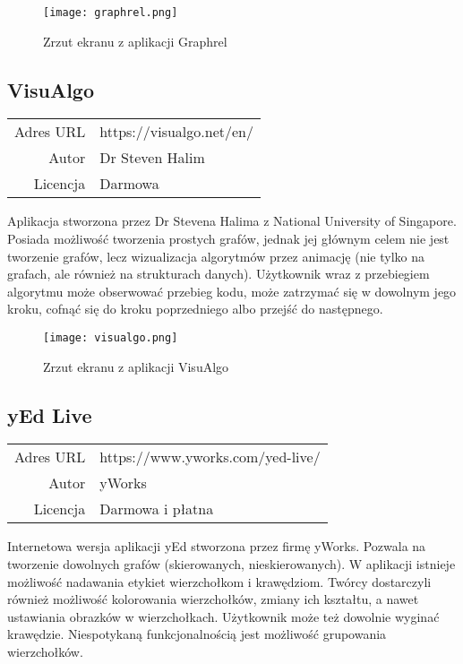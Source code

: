 \begin{figure}[H]
\centering
\texttt{[image: graphrel.png]}
\caption{Zrzut ekranu z aplikacji Graphrel}
\end{figure}

\subsection*{VisuAlgo}
\bigskip
\noindent\begin{tabularx}{\textwidth}{r|X|}
\cline{2-2}
  Adres URL & https://visualgo.net/en/ \\ 
\cline{2-2} 
 Autor & Dr Steven Halim \\ 
\cline{2-2}
 Licencja & Darmowa\\ 
\cline{2-2}
\end{tabularx} 
\bigskip

Aplikacja stworzona przez Dr Stevena Halima z National University of Singapore. Posiada możliwość tworzenia prostych grafów, jednak jej głównym celem nie jest tworzenie grafów, lecz wizualizacja algorytmów przez animację (nie tylko na grafach, ale również na strukturach danych). Użytkownik wraz z przebiegiem algorytmu może obserwować przebieg kodu, może zatrzymać się w dowolnym jego kroku, cofnąć się do kroku poprzedniego albo przejść do następnego.

\begin{figure}[H]
\centering
\texttt{[image: visualgo.png]}
\caption{Zrzut ekranu z aplikacji VisuAlgo}
\end{figure}

\subsection*{yEd Live}
\bigskip
\noindent\begin{tabularx}{\textwidth}{r|X|}
\cline{2-2}
  Adres URL & https://www.yworks.com/yed-live/ \\ 
\cline{2-2} 
 Autor & yWorks\\ 
\cline{2-2}
 Licencja & Darmowa i płatna\\ 
\cline{2-2}
\end{tabularx}
\bigskip

Internetowa wersja aplikacji yEd stworzona przez firmę yWorks. Pozwala na tworzenie dowolnych grafów (skierowanych, nieskierowanych). W aplikacji istnieje możliwość nadawania etykiet wierzchołkom i krawędziom. Twórcy dostarczyli również możliwość kolorowania wierzchołków, zmiany ich kształtu, a nawet ustawiania obrazków w wierzchołkach. Użytkownik może też dowolnie wyginać krawędzie. Niespotykaną funkcjonalnością jest możliwość grupowania wierzchołków. 

